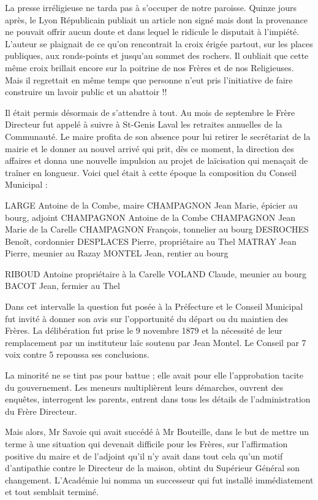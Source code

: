 La presse irréligieuse ne tarda pas à s'occuper de notre paroisse. Quinze jours après, le Lyon Républicain publiait un article non signé mais dont la provenance ne pouvait offrir aucun doute et dans lequel le ridicule le disputait à l'impiété. L'auteur se plaignait de ce qu'on rencontrait la croix érigée partout, sur les places publiques, aux ronds-points et jusqu'au sommet des rochers. Il oubliait que cette même croix brillait encore sur la poitrine de nos Frères et de nos Religieuses. Mais il regrettait en même temps que personne n'eut pris l'initiative de faire construire un lavoir public et un abattoir !!

Il était permis désormais de s'attendre à tout. Au mois de septembre le Frère Directeur fut appelé à suivre à St-Genis Laval les retraites annuelles de la Communauté. Le maire profita de son absence pour lui retirer le secrétariat de la mairie et le donner au nouvel arrivé qui prit, dès ce moment, la direction des affaires et donna une nouvelle impulsion au projet de laïcisation qui menaçait de traîner en longueur. Voici quel était à cette époque la composition du Conseil Municipal :

LARGE Antoine de la Combe, maire  
CHAMPAGNON Jean Marie, épicier au bourg, adjoint  
CHAMPAGNON Antoine de la Combe  
CHAMPAGNON Jean Marie de la Carelle  
CHAMPAGNON François, tonnelier au bourg  
DESROCHES Benoît, cordonnier  
DESPLACES Pierre, propriétaire au Thel  
MATRAY Jean Pierre, meunier au Razay  
MONTEL Jean, rentier au bourg

RIBOUD Antoine propriétaire à la Carelle  
VOLAND Claude, meunier au bourg  
BACOT Jean, fermier au Thel

Dans cet intervalle la question fut posée à la Préfecture et le Conseil Municipal fut invité à donner son avis sur l'opportunité du départ ou du maintien des Frères. La délibération fut prise le 9 novembre 1879 et la nécessité de leur remplacement par un instituteur laïc soutenu par Jean Montel. Le Conseil par 7 voix contre 5 repoussa ses conclusions.

La minorité ne se tint pas pour battue ; elle avait pour elle l'approbation tacite du gouvernement. Les meneurs multiplièrent leurs démarches, ouvrent des enquêtes, interrogent les parents, entrent dans tous les détails de l'administration du Frère Directeur.

Mais alors, Mr Savoie qui avait succédé à Mr Bouteille, dans le but de mettre un terme à une situation qui devenait difficile pour les Frères, sur l'affirmation positive du maire et de l'adjoint qu'il n'y avait dans tout cela qu'un motif d'antipathie contre le Directeur de la maison, obtint du Supérieur Général son changement. L'Académie lui nomma un successeur qui fut installé immédiatement et tout semblait terminé.

